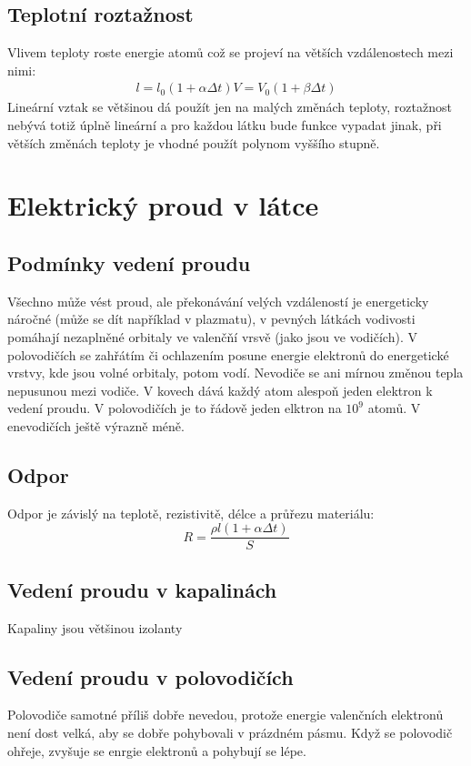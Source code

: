 \documentclass[titlepage]{book}
\begin{document}
\section{Teplotní roztažnost}
Vlivem teploty roste energie atomů což se projeví na větších vzdálenostech mezi nimi:\\
\begin{align}
l = l_0 (1 + \alpha \Delta t)
V = V_0 (1 + \beta \Delta t)
\end{align}
Lineární vztak se většinou dá použít jen na malých změnách teploty, roztažnost nebývá totiž úplně lineární a pro každou látku bude funkce vypadat jinak, při větších změnách teploty je vhodné použít polynom vyššího stupně.
\chapter{Elektrický proud v látce}
\section{Podmínky vedení proudu}
Všechno může vést proud, ale překonávání velých vzdáleností je energeticky náročné (může se dít například v plazmatu), v pevných látkách vodivosti pomáhají nezaplněné orbitaly ve valenčňí vrsvě (jako jsou ve vodičích). V polovodičích se zahřátím či ochlazením posune energie elektronů do energetické vrstvy, kde jsou volné orbitaly, potom vodí. Nevodiče se ani mírnou změnou tepla nepusunou mezi vodiče. V kovech dává každý atom alespoň jeden elektron k vedení proudu. V polovodičích je to řádově jeden elktron na $10^{9}$ atomů. V enevodičích ještě výrazně méně.
\section{Odpor}
Odpor je závislý na teplotě, rezistivitě, délce a průřezu materiálu:\\
\begin{equation}
R = \frac{\rho l (1+ \alpha \Delta t)}{S}
\end{equation}
\section{Vedení proudu v kapalinách}
Kapaliny jsou většinou izolanty


\section{Vedení proudu v polovodičích}
Polovodiče samotné příliš dobře nevedou, protože energie valenčních elektronů není dost velká, aby se dobře pohybovali v prázdném pásmu. Když se polovodič ohřeje, zvyšuje se enrgie elektronů a pohybují se lépe.
\end{document}
